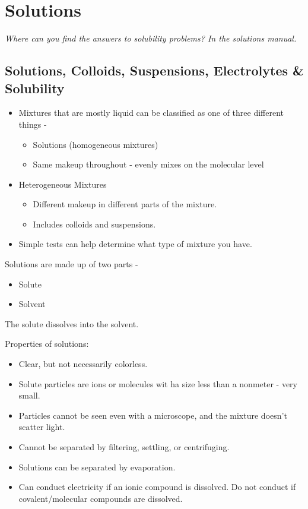\documentclass[../hchem.tex]{subfiles}
\begin{document}
\chapter{Solutions}
\textit{Where can you find the answers to solubility problems? In the solutions manual.}
\section{Solutions, Colloids, Suspensions, Electrolytes \& Solubility}
\begin{itemize}
    \item Mixtures that are mostly liquid can be classified as one of three different things - 
    \begin{itemize}
        \item Solutions (homogeneous mixtures)
        \item Same makeup throughout - evenly mixes on the molecular level 
    \end{itemize}

    \item Heterogeneous Mixtures
    \begin{itemize}
        \item Different makeup in different parts of the mixture.
        \item Includes colloids and suspensions.
    \end{itemize}
    \item Simple tests can help determine what type of mixture you have.
\end{itemize}

Solutions are made up of two parts -
\begin{itemize}
    \item Solute 
    \item Solvent
\end{itemize}

The solute dissolves into the solvent.

Properties of solutions:
\begin{itemize}
    \item Clear, but not necessarily colorless.
    \item Solute particles are ions or molecules wit ha size less than a nonmeter - very small.
    \item Particles cannot be seen even with a microscope, and the mixture doesn't scatter light.
    \item Cannot be separated by filtering, settling, or centrifuging.
    \item Solutions can be separated by evaporation.
    \item Can conduct electricity if an ionic compound is dissolved. Do not conduct if covalent/molecular compounds are dissolved.
\end{itemize}
\end{document}
